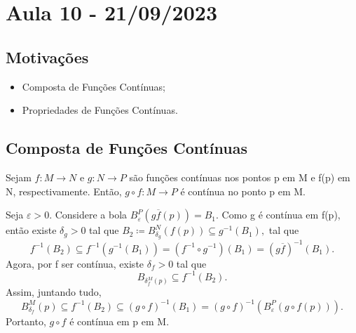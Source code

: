 \documentclass[MetricSpaces/metric_notes.tex]{subfiles}
\begin{document}
\section{Aula 10 - 21/09/2023}
\subsection{Motivações}
\begin{itemize}
	\item Composta de Funções Contínuas;
	\item Propriedades de Funções Contínuas.
\end{itemize}
\subsection{Composta de Funções Contínuas}
\begin{prop*}
	Sejam \(f:M\rightarrow N\) e \(g:N\rightarrow P\) são funções contínuas nos pontos p em M e f(p) em N,
	respectivamente. Então, \(g\circ{f}:M\rightarrow P\) é contínua no ponto p em M.
\end{prop*}
\begin{proof*}
	Seja \(\varepsilon >0.\) Considere a bola \(B_{\varepsilon }^{P}(g\overline{f}(p)) = B_{1}.\) Como g é contínua em f(p), então
	existe \(\delta_{g}>0\) tal que \(B_{2}\coloneqq B_{\delta_{g}}^{N}(f(p))\subseteq{g^{-1}(B_{1}),}\) tal que
	\[
		f^{-1}(B_{2})\subseteq{f^{-1}(g^{-1}(B_{1}))} = (f^{-1}\circ{g^{-1}})(B_{1}) = (g\overline{f})^{-1}(B_{1}).
	\]
	Agora, por f ser contínua, existe \(\delta_{f}>0\) tal que
	\[
		B_{\delta_{f}^{M}(p)}\subseteq{f^{-1}(B_{2})}.
	\]
	Assim, juntando tudo,
	\[
		B_{\delta_{f}}^{M}(p)\subseteq{f^{-1}(B_{2})}\subseteq{(g\circ{f})^{-1}(B_{1})} = (g\circ{f})^{-1}(B_{\varepsilon }^{P}(g\circ{f}(p))).
	\]
	Portanto, \(g\circ{f}\) é contínua em p em M. \qedsymbol
\end{proof*}
\end{document}
